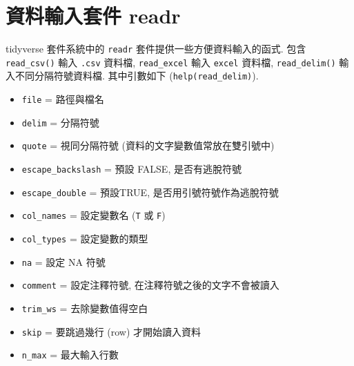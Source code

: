 \documentclass[
]{book}
\providecommand{\tightlist}{%
  \setlength{\itemsep}{0pt}\setlength{\parskip}{0pt}}
\begin{document}
\hypertarget{ux8cc7ux6599ux8f38ux5165ux5957ux4ef6-readr}{%
\section{資料輸入套件 readr}\label{ux8cc7ux6599ux8f38ux5165ux5957ux4ef6-readr}}

tidyverse 套件系統中的 \texttt{readr} 套件提供一些方便資料輸入的函式.
包含
\texttt{read\_csv()} 輸入 \texttt{.csv} 資料檔,
\texttt{read\_excel} 輸入 \texttt{excel} 資料檔,
\texttt{read\_delim()} 輸入不同分隔符號資料檔.
其中引數如下 (\texttt{help(read\_delim)}).

\begin{itemize}
\tightlist
\item
  \texttt{file} = 路徑與檔名
\item
  \texttt{delim} = 分隔符號
\item
  \texttt{quote} = 視同分隔符號 (資料的文字變數值常放在雙引號中)
\item
  \texttt{escape\_backslash} = 預設 FALSE, 是否有逃脫符號
\item
  \texttt{escape\_double} = 預設TRUE, 是否用引號符號作為逃脫符號
\item
  \texttt{col\_names} = 設定變數名 (\texttt{T} 或 \texttt{F})
\item
  \texttt{col\_types} = 設定變數的類型
\item
  \texttt{na} = 設定 NA 符號
\item
  \texttt{comment} = 設定注釋符號, 在注釋符號之後的文字不會被讀入
\item
  \texttt{trim\_ws} = 去除變數值得空白
\item
  \texttt{skip} = 要跳過幾行 (row) 才開始讀入資料
\item
  \texttt{n\_max} = 最大輸入行數
\end{itemize}
\end{document}
